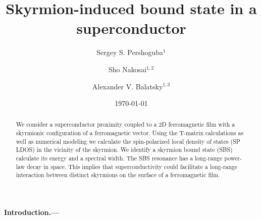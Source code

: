 \documentclass[twocolumn,showpacs,floatfix,longbibliography]{revtex4-1}
\begin{document}
\title{Skyrmion-induced bound state in a superconductor}

\author{Sergey S. Pershoguba$^{1}$}
\author{Sho Nakosai$^{1,2}$}
\author{Alexander V. Balatsky$^{1,3}$}

\date{\today}


\begin{abstract}
We consider a superconductor proximity coupled to a 2D ferromagnetic film with a skyrmionic configuration of a ferromagnetic vector. Using the T-matrix calculations as well as numerical modeling we calculate the spin-polarized local density of states (SP LDOS) in the vicinity of the skyrmion. We identify a skyrmion bound state (SBS) calculate its energy and a spectral width. The SBS resonance has a long-range power-law decay in space. This implies that superconductivity could facilitate a long-range interaction between distinct skyrmions on the surface of a ferromagnetic film.
\end{abstract}

\pacs{ }   


\maketitle
\paragraph*{Introduction.---} \label{sec:intro}
\end{document}
